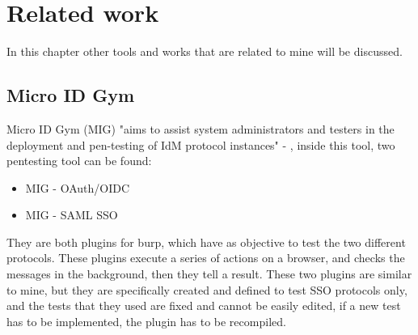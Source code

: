 \chapter{Related work}
In this chapter other tools and works that are related to mine will be discussed.

\section{Micro ID Gym}
Micro ID Gym (MIG) "aims to assist system administrators and testers in the deployment and pen-testing of IdM protocol instances" - \cite{micro_id_gym}, inside this tool, two pentesting tool can be found:
\begin{itemize}
    \item MIG - OAuth/OIDC \cite{claudio_grisenti}
    \item MIG - SAML SSO \cite{stefano_facchini}
\end{itemize}
They are both plugins for \Gls{burp}, which have as objective to test the two different protocols. These plugins execute a series of actions on a browser, and checks the messages in the background, then they tell a result.
These two plugins are similar to mine, but they are specifically created and defined to test SSO protocols only, and the tests that they used are fixed and cannot be easily edited, if a new test has to be implemented, the plugin has to be recompiled.

